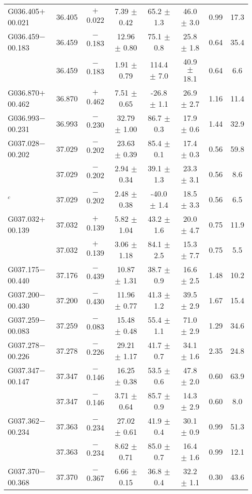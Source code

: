 \begin{ThreePartTable}
\begin{longtable}{lccccccc}
G036.405$+$00.021     &36.405&	$+$0.022	&7.39	$\pm$ 0.42	&65.2	$\pm$ 1.3	&46.0	$\pm$ 3.0	&0.99	&17.3\\
G036.459$-$00.183     &36.459&	$-$0.183	&12.96	$\pm$ 0.80	&75.1	$\pm$ 0.8	&25.8	$\pm$ 1.8	&0.64	&35.4\\
                      &36.459&	$-$0.183	&1.91	$\pm$ 0.79	&114.4	$\pm$ 7.0	&40.9	$\pm$ 18.1	&0.64	&6.6\\
G036.870$+$00.462     &36.870&	$+$0.462	&7.51	$\pm$ 0.65	&-26.8	$\pm$ 1.1	&26.9	$\pm$ 2.7	&1.16	&11.4\\
G036.993$-$00.231     &36.993&	$-$0.230	&32.79	$\pm$ 1.00	&86.7	$\pm$ 0.3	&17.9	$\pm$ 0.6	&1.44	&32.9\\
G037.028$-$00.202     &37.029&	$-$0.202	&23.63	$\pm$ 0.39	&85.4	$\pm$ 0.1	&17.4	$\pm$ 0.3	&0.56	&59.8\\
                      &37.029&	$-$0.202	&2.94	$\pm$ 0.34	&39.1	$\pm$ 1.3	&23.3	$\pm$ 3.1	&0.56	&8.6\\
 $^c$                     &37.029&	$-$0.202	&2.48	$\pm$ 0.38	&-40.0	$\pm$ 1.4	&18.5	$\pm$ 3.3	&0.56	&6.5\\
G037.032$+$00.139     &37.032&	$+$0.139	&5.82	$\pm$ 1.04	&43.2	$\pm$ 1.6	&20.0	$\pm$ 4.7	&0.75	&11.9\\
                      &37.032&	$+$0.139	&3.06	$\pm$ 1.18	&84.1	$\pm$ 2.5	&15.3	$\pm$ 7.7	&0.75	&5.5\\
G037.175$-$00.440     &37.176&	$-$0.439	&10.87	$\pm$ 1.31	&38.7	$\pm$ 0.9	&16.6	$\pm$ 2.5	&1.48	&10.2\\
G037.200$-$00.430     &37.200&	$-$0.430	&11.96	$\pm$ 0.77	&41.3	$\pm$ 1.2	&39.5	$\pm$ 2.9	&1.67	&15.4\\
G037.259$-$00.083     &37.259&	$-$0.083	&15.48	$\pm$ 0.48	&55.4	$\pm$ 1.1	&71.0	$\pm$ 2.9	&1.29	&34.6\\
G037.278$-$00.226     &37.278&	$-$0.226	&29.21	$\pm$ 1.17	&41.7	$\pm$ 0.7	&34.1	$\pm$ 1.6	&2.35	&24.8\\
G037.347$-$00.147     &37.347&	$-$0.146	&16.25	$\pm$ 0.38	&53.5	$\pm$ 0.6	&47.8	$\pm$ 2.0	&0.60	&63.9\\
                      &37.347&	$-$0.146	&3.71	$\pm$ 0.64	&85.7	$\pm$ 0.9	&14.3	$\pm$ 2.9	&0.60	&8.0\\
G037.362$-$00.234     &37.363&	$-$0.234	&27.02	$\pm$ 0.61	&41.9	$\pm$ 0.4	&30.1	$\pm$ 0.9	&0.99	&51.3\\
                      &37.363&	$-$0.234	&8.62	$\pm$ 0.71	&85.0	$\pm$ 0.7	&16.4	$\pm$ 1.6	&0.99	&12.1\\
G037.370$-$00.368     &37.370&	$-$0.367	&6.66	$\pm$ 0.15	&36.8	$\pm$ 0.4	&32.2	$\pm$ 1.1	&0.30	&43.6\\

\end{longtable}
\end{ThreePartTable}

